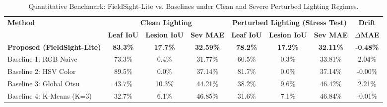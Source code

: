 \begin{table}[htbp]
\centering
\caption{Quantitative Benchmark: FieldSight-Lite vs. Baselines under Clean and Severe Perturbed Lighting Regimes.}
\label{tab:fieldsight_benchmarks}
\small
\begin{tabular}{lcccccc|c}
\hline
\textbf{Method} & \multicolumn{3}{c}{\textbf{Clean Lighting}} & \multicolumn{3}{c}{\textbf{Perturbed Lighting (Stress Test)}} & \textbf{Drift} \\
 & \textbf{Leaf IoU} & \textbf{Lesion IoU} & \textbf{Sev MAE} & \textbf{Leaf IoU} & \textbf{Lesion IoU} & \textbf{Sev MAE} & \textbf{$\Delta$MAE} \\
\hline
\textbf{Proposed (FieldSight-Lite)} & \textbf{83.3\%} & \textbf{17.7\%} & \textbf{32.59\%} & \textbf{78.2\%} & \textbf{17.2\%} & \textbf{32.11\%} & \textbf{-0.48\%} \\
Baseline 1: RGB Naive & 73.3\% & 0.4\% & 31.77\% & 60.5\% & 0.3\% & 33.81\% & 2.04\% \\
Baseline 2: HSV Color & 89.5\% & 0.0\% & 37.14\% & 81.7\% & 0.0\% & 37.14\% & -0.00\% \\
Baseline 3: Global Otsu & 43.7\% & 10.3\% & 44.21\% & 38.2\% & 9.6\% & 46.42\% & 2.21\% \\
Baseline 4: K-Means (K=3) & 32.7\% & 6.1\% & 46.85\% & 31.6\% & 7.1\% & 46.84\% & -0.01\% \\
\hline
\end{tabular}
\end{table}